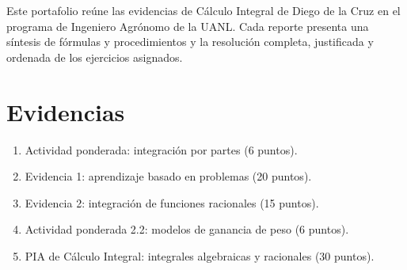 \documentclass[spanish,letterpaper,oneside]{article}
\begin{document}
\templatePortrait
\templatePagecfg
\onehalfspacing

\begin{abstractd}
Este portafolio reúne las evidencias de Cálculo Integral de Diego de la Cruz en el programa de Ingeniero Agrónomo de la UANL. Cada reporte presenta una síntesis de fórmulas y procedimientos y la resolución completa, justificada y ordenada de los ejercicios asignados.
\end{abstractd}

\templateIndex
\templateFinalcfg

\section{Evidencias}
\begin{enumerate}
  \item Actividad ponderada: integración por partes (6 puntos).
  \item Evidencia 1: aprendizaje basado en problemas (20 puntos).
  \item Evidencia 2: integración de funciones racionales (15 puntos).
  \item Actividad ponderada 2.2: modelos de ganancia de peso (6 puntos).
  \item PIA de Cálculo Integral: integrales algebraicas y racionales (30 puntos).
\end{enumerate}

\nocite{*}

\end{document}
